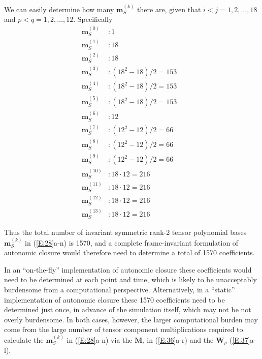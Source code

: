 We can easily determine how many  $\mathbf{m}^{(k)}_S$ there are, given that $i<j=1,2,\ldots,18$ and $p<q=1,2,\ldots,12$.  Specifically   	
%
\begin{subequations}
\label{E:39}
\begin{align}
	 \mathbf{m}^{(0)}_S   &: 1 	&   	\\  
	 \mathbf{m}^{(1)}_S   &: 18 	&   	\\  
	 \mathbf{m}^{(2)}_S   &: 18 	&   	\\  
	 \mathbf{m}^{(3)}_S   &: (18^2 - 18)/2 = 153 	&   	\\  
	 \mathbf{m}^{(4)}_S   &: (18^2 - 18)/2 = 153  	&   	\\  
	 \mathbf{m}^{(5)}_S   &: (18^2 - 18)/2 = 153  	&   	\\  
	 \mathbf{m}^{(6)}_S   &: 12 	&   	\\  
	 \mathbf{m}^{(7)}_S   &: (12^2 - 12)/2 = 66 	&   	\\ 
	 \mathbf{m}^{(8)}_S   &: (12^2 - 12)/2 = 66 	&   	\\ 
	 \mathbf{m}^{(9)}_S   &: (12^2 - 12)/2 = 66 	&   	\\  
	 \mathbf{m}^{(10)}_S  &: 18 \cdot 12 = 216 	&   	\\ 
	 \mathbf{m}^{(11)}_S  &: 18 \cdot 12 = 216 	&   	\\ 
	 \mathbf{m}^{(12)}_S  &: 18 \cdot 12 = 216 	&   	\\ 
	 \mathbf{m}^{(13)}_S  &: 18 \cdot 12 = 216 	&    
\end{align}
\end{subequations}
%
%    

Thus the total number of invariant symmetric rank-2 tensor polynomial bases $\mathbf{m}^{(k)}_S$  in (\ref{E:28}a-n) is 1570, and a complete frame-invariant formulation of autonomic closure would therefore need to determine a total of 1570 coefficients. 

In an ``on-the-fly'' implementation of autonomic closure these coefficients would need to be determined at each point and time, which is likely to be unacceptably burdensome from a computational perspective. Alternatively, in a ``static'' implementation of autonomic closure these 1570 coefficients need to be determined just once, in advance of the simulation itself, which may not be not overly burdensome.  In both cases, however, the larger computational burden may come from the large number of tensor component multiplications required to calculate the $\mathbf{m}^{(k)}_S$  in (\ref{E:28}a-n) via the  $\mathbf{M}_i$ in (\ref{E:36}a-r) and the $\mathbf{W}_p$ (\ref{E:37}a-l).


